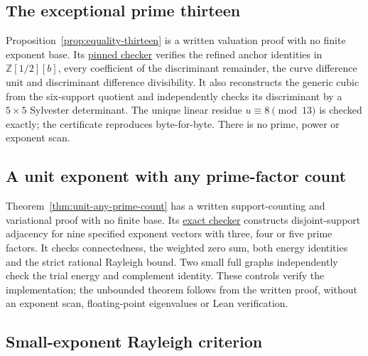 \subsection{The exceptional prime thirteen}

Proposition~\ref{prop:equality-thirteen} is a written valuation proof
with no finite exponent base. Its
\href{https://github.com/the-omega-institute/ideal-intersection-laplacian/blob/eb6b7d378205033154c328cd5c543332f27b6467/scripts/check_endpoint_one_equality_thirteen.py}{pinned checker}
verifies the refined anchor identities in $\mathbb Z[1/2][b]$, every
coefficient of the discriminant remainder, the curve difference unit
and discriminant difference divisibility. It also reconstructs the
generic cubic from the six-support quotient and independently checks
its discriminant by a $5\times5$ Sylvester determinant. The unique
linear residue $u\equiv8\pmod{13}$ is checked exactly; the certificate
reproduces byte-for-byte. There is no prime, power or exponent scan.

\subsection{A unit exponent with any prime-factor count}

Theorem~\ref{thm:unit-any-prime-count} has a written support-counting
and variational proof with no finite base. Its
\href{https://github.com/the-omega-institute/ideal-intersection-laplacian/blob/16a677c34ffe2d8da84f3c1248b7698a7eadd960/scripts/check_unit_exponent_any_prime_count.py}{exact checker}
constructs disjoint-support adjacency for nine specified exponent
vectors with three, four or five prime factors. It checks connectedness,
the weighted zero sum, both energy identities and the strict rational
Rayleigh bound. Two small full graphs independently check the trial
energy and complement identity. These controls verify the implementation;
the unbounded theorem follows from the written proof, without
an exponent scan, floating-point eigenvalues or Lean verification.

\subsection{Small-exponent Rayleigh criterion}

